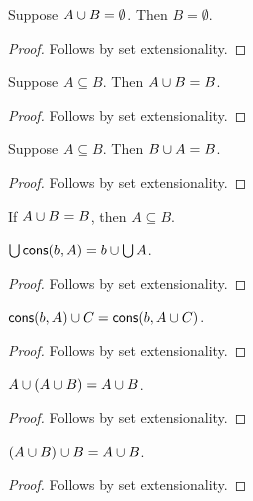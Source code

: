 \begin{proposition}%
\label{union_emptyset_elim_right}
    Suppose $A\cup B = \emptyset$. Then $B = \emptyset$.
\end{proposition}
\begin{proof}
    Follows by set extensionality.
\end{proof}

\begin{proposition}%
\label{union_absorb_subseteq_left}
    Suppose $A\subseteq B$. Then $A\cup B = B$.
\end{proposition}
\begin{proof}
    Follows by set extensionality.
\end{proof}

\begin{proposition}%
\label{union_absorb_subseteq_right}
    Suppose $A\subseteq B$. Then $B\cup A = B$.
\end{proposition}
\begin{proof}
    Follows by set extensionality.
\end{proof}

\begin{proposition}%
\label{union_eq_self_implies_subseteq}
    If $A\cup B = B$, then $A\subseteq B$.
\end{proposition}

\begin{proposition}\label{unions_cons}
    $\bigcup \operatorname{\mathsf{cons}}(b,A) = b\cup\bigcup A$.
\end{proposition}
\begin{proof}
    Follows by set extensionality.
\end{proof}

\begin{proposition}\label{union_cons}
    $\operatorname{\mathsf{cons}}(b,A) \cup C = \operatorname{\mathsf{cons}}(b,A\cup C)$.
\end{proposition}
\begin{proof}
    Follows by set extensionality.
\end{proof}

\begin{proposition}\label{union_absorb_left}
    $A\cup (A\cup B) = A\cup B$.
\end{proposition}
\begin{proof}
    Follows by set extensionality.
\end{proof}

\begin{proposition}\label{union_absorb_right}
    $(A\cup B)\cup B = A\cup B$.
\end{proposition}
\begin{proof}
    Follows by set extensionality.
\end{proof}

